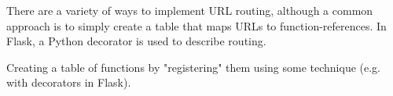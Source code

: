 There are a variety of ways to implement URL routing, although a common approach is to simply create a table that maps URLs to function-references. In Flask, a Python decorator is used to describe routing.

\begin{definition}
	Creating a table of functions by "registering" them using some technique (e.g. with decorators in Flask).
\end{definition}
